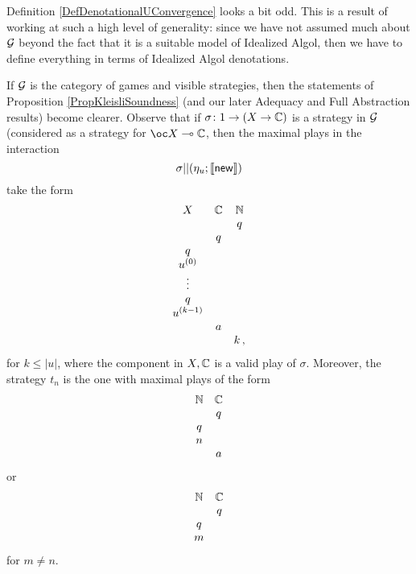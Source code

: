 \begin{remark}
  Definition \ref{DefDenotationalUConvergence} looks a bit odd.  
  This is a result of working at such a high level of generality: since we have not assumed much about $\mathcal G$ beyond the fact that it is a suitable model of Idealized Algol, then we have to define everything in terms of Idealized Algol denotations.

  If $\mathcal G$ is the category of games and visible strategies, then the statements of Proposition \ref{PropKleisliSoundness} (and our later Adequacy and Full Abstraction results) become clearer.  
  Observe that if $\sigma \colon 1 \to (X \to \mathbb{C})$ is a strategy in $\mathcal G$ (considered as a strategy for $\oc X \implies \bC$, then the maximal plays in the interaction
  \[
    \sigma || (\eta_u;\left\llbracket\operatorname{{\mathsf{new}}}\right\rrbracket)
    \]
  take the form
  \[
    \begin{array}{ccc}
      X         & \mathbb{C} & \mathbb{N} \\
                &     &  q  \\
                &  q  &     \\
      q         &     &     \\
      u^{(0)}   &     &     \\
      \vdots    &     &     \\
      q         &     &     \\
      u^{(k-1)} &     &     \\
                &  a  &     \\
                &     &  {k\,,}  \\
    \end{array}
    \]
  for $k\le |u|$, where the component in $X,\mathbb{C}$ is a valid play of $\sigma$.
  Moreover, the strategy $t_n$ is the one with maximal plays of the form
  \[
    \begin{array}{cc}
      \mathbb{N} & \mathbb{C} \\
          &  q  \\
      q   &     \\
      n   &     \\
          &  a
    \end{array}
    \]
  or
  \[
    \begin{array}{cc}
      \mathbb{N} & \mathbb{C} \\
          &  q  \\
      q   &     \\
      m   &
    \end{array}
    \]
  for $m\ne n$.


\end{remark}
